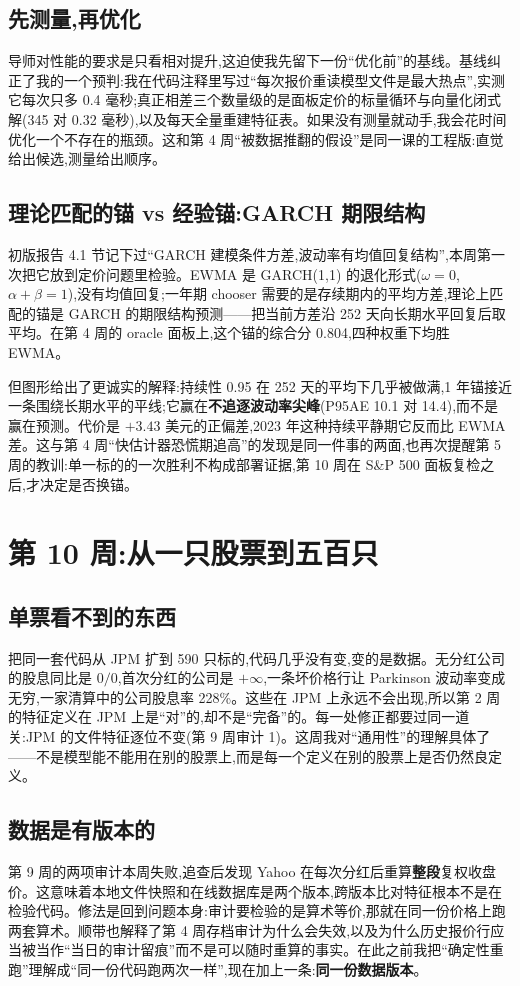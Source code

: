 \documentclass[11pt]{ctexart}
\begin{document}
\subsection{先测量,再优化}
导师对性能的要求是只看相对提升,这迫使我先留下一份“优化前”的基线。基线纠正了我的一个预判:我在代码注释里写过“每次报价重读模型文件是最大热点”,实测它每次只多 0.4 毫秒;真正相差三个数量级的是面板定价的标量循环与向量化闭式解(345 对 0.32 毫秒),以及每天全量重建特征表。如果没有测量就动手,我会花时间优化一个不存在的瓶颈。这和第 4 周“被数据推翻的假设”是同一课的工程版:直觉给出候选,测量给出顺序。

\subsection{理论匹配的锚 vs 经验锚:GARCH 期限结构}
初版报告 4.1 节记下过“GARCH 建模条件方差,波动率有均值回复结构”,本周第一次把它放到定价问题里检验。EWMA 是 GARCH(1,1) 的退化形式($\omega=0$,$\alpha+\beta=1$),没有均值回复;一年期 chooser 需要的是存续期内的平均方差,理论上匹配的锚是 GARCH 的期限结构预测——把当前方差沿 252 天向长期水平回复后取平均。在第 4 周的 oracle 面板上,这个锚的综合分 0.804,四种权重下均胜 EWMA。

但图形给出了更诚实的解释:持续性 0.95 在 252 天的平均下几乎被做满,1 年锚接近一条围绕长期水平的平线;它赢在\textbf{不追逐波动率尖峰}(P95AE 10.1 对 14.4),而不是赢在预测。代价是 $+3.43$ 美元的正偏差,2023 年这种持续平静期它反而比 EWMA 差。这与第 4 周“快估计器恐慌期追高”的发现是同一件事的两面,也再次提醒第 5 周的教训:单一标的的一次胜利不构成部署证据,第 10 周在 S\&P 500 面板复检之后,才决定是否换锚。

\section{第 10 周:从一只股票到五百只}

\subsection{单票看不到的东西}
把同一套代码从 JPM 扩到 590 只标的,代码几乎没有变,变的是数据。无分红公司的股息同比是 $0/0$,首次分红的公司是 $+\infty$,一条坏价格行让 Parkinson 波动率变成无穷,一家清算中的公司股息率 228\%。这些在 JPM 上永远不会出现,所以第 2 周的特征定义在 JPM 上是“对”的,却不是“完备”的。每一处修正都要过同一道关:JPM 的文件特征逐位不变(第 9 周审计 1)。这周我对“通用性”的理解具体了——不是模型能不能用在别的股票上,而是每一个定义在别的股票上是否仍然良定义。

\subsection{数据是有版本的}
第 9 周的两项审计本周失败,追查后发现 Yahoo 在每次分红后重算\textbf{整段}复权收盘价。这意味着本地文件快照和在线数据库是两个版本,跨版本比对特征根本不是在检验代码。修法是回到问题本身:审计要检验的是算术等价,那就在同一份价格上跑两套算术。顺带也解释了第 4 周存档审计为什么会失效,以及为什么历史报价行应当被当作“当日的审计留痕”而不是可以随时重算的事实。在此之前我把“确定性重跑”理解成“同一份代码跑两次一样”,现在加上一条:\textbf{同一份数据版本}。
\end{document}
